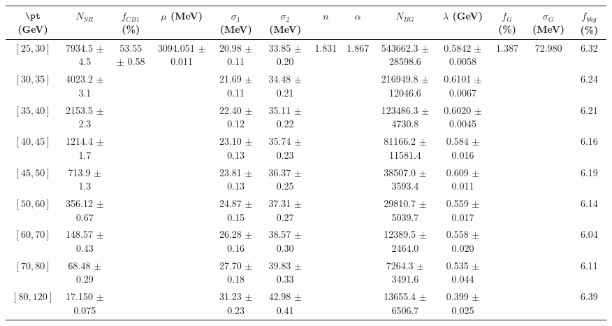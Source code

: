 \begin{tabular}{c||c|c|c|c|c|c|c|c|c|c|c||c}
$\pt$ (GeV) & $N_{SR}$ & $f_{CB1}$ (\%) & $\mu$ (MeV) & $\sigma_1$ (MeV) & $\sigma_2$ (MeV) & $n$ & $\alpha$ & $N_{BG}$ & $\lambda$ (GeV) & $f_G$ (\%) & $\sigma_G$ (MeV) & $f_{bkg}$ (\%) \\
\hline
$[25, 30]$ & 7934.5 $\pm$ 4.5 & \multirow{9}{*}{53.55 $\pm$ 0.58} & \multirow{9}{*}{3094.051 $\pm$ 0.011} & 20.98 $\pm$ 0.11 & 33.85 $\pm$ 0.20 & \multirow{9}{*}{1.831} & \multirow{9}{*}{1.867} & 543662.3 $\pm$ 28598.6 & 0.5842 $\pm$ 0.0058 & \multirow{9}{*}{1.387} & \multirow{9}{*}{72.980} & 6.32\\
$[30, 35]$ & 4023.2 $\pm$ 3.1 &  &  & 21.69 $\pm$ 0.11 & 34.48 $\pm$ 0.21 &  &  & 216949.8 $\pm$ 12046.6 & 0.6101 $\pm$ 0.0067 &  &  & 6.24\\
$[35, 40]$ & 2153.5 $\pm$ 2.3 &  &  & 22.40 $\pm$ 0.12 & 35.11 $\pm$ 0.22 &  &  & 123486.3 $\pm$ 4730.8 & 0.6020 $\pm$ 0.0045 &  &  & 6.21\\
$[40, 45]$ & 1214.4 $\pm$ 1.7 &  &  & 23.10 $\pm$ 0.13 & 35.74 $\pm$ 0.23 &  &  & 81166.2 $\pm$ 11581.4 & 0.584 $\pm$ 0.016 &  &  & 6.16\\
$[45, 50]$ & 713.9 $\pm$ 1.3 &  &  & 23.81 $\pm$ 0.13 & 36.37 $\pm$ 0.25 &  &  & 38507.0 $\pm$ 3593.4 & 0.609 $\pm$ 0.011 &  &  & 6.19\\
$[50, 60]$ & 356.12 $\pm$ 0.67 &  &  & 24.87 $\pm$ 0.15 & 37.31 $\pm$ 0.27 &  &  & 29810.7 $\pm$ 5039.7 & 0.559 $\pm$ 0.017 &  &  & 6.14\\
$[60, 70]$ & 148.57 $\pm$ 0.43 &  &  & 26.28 $\pm$ 0.16 & 38.57 $\pm$ 0.30 &  &  & 12389.5 $\pm$ 2464.0 & 0.558 $\pm$ 0.020 &  &  & 6.04\\
$[70, 80]$ & 68.48 $\pm$ 0.29 &  &  & 27.70 $\pm$ 0.18 & 39.83 $\pm$ 0.33 &  &  & 7264.3 $\pm$ 3491.6 & 0.535 $\pm$ 0.044 &  &  & 6.11\\
$[80, 120]$ & 17.150 $\pm$ 0.075 &  &  & 31.23 $\pm$ 0.23 & 42.98 $\pm$ 0.41 &  &  & 13655.4 $\pm$ 6506.7 & 0.399 $\pm$ 0.025 &  &  & 6.39\\
\end{tabular}
